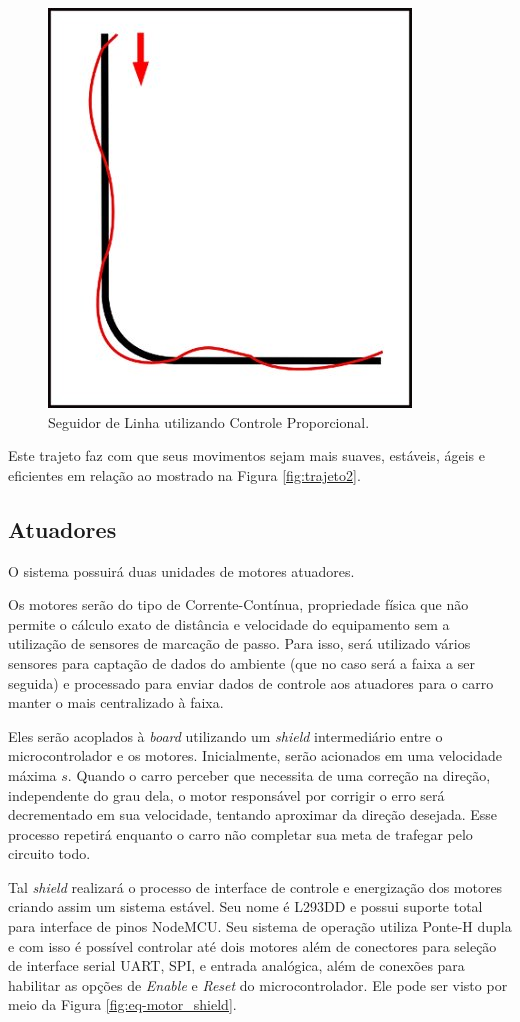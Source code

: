 \documentclass[portugues, brazil, a4paper,12pt]{article}
\begin{document}
		\begin{figure}[H]
			\centering
			\includegraphics[width=0.5\linewidth]{img/trajeto3.jpg}
			\caption{Seguidor de Linha utilizando Controle Proporcional.}
			\label{fig:trajeto3}
		\end{figure}
	
		Este trajeto faz com que seus movimentos sejam mais suaves, estáveis, ágeis e eficientes em relação ao mostrado na Figura \ref{fig:trajeto2}.
		
		
	\subsection{Atuadores}
		O sistema possuirá duas unidades de motores atuadores.
		
		Os motores serão do tipo de Corrente-Contínua, propriedade física que não permite o cálculo exato de distância e velocidade do equipamento sem a utilização de sensores de marcação de passo. Para isso, será utilizado vários sensores para captação de dados do ambiente (que no caso será a faixa a ser seguida) e processado para enviar dados de controle aos atuadores para o carro manter o mais centralizado à faixa.
		
		Eles serão acoplados à \textit{board} utilizando um \textit{shield} intermediário entre o microcontrolador e os motores. Inicialmente, serão acionados em uma velocidade máxima $ s $. Quando o carro perceber que necessita de uma correção na direção, independente do grau dela, o motor responsável por corrigir o erro será decrementado em sua velocidade, tentando aproximar da direção desejada. Esse processo repetirá enquanto o carro não completar sua meta de trafegar pelo circuito todo.
		
		Tal \textit{shield} realizará o processo de interface de controle e energização dos motores criando assim um sistema estável. Seu nome é L293DD e possui suporte total para interface de pinos NodeMCU. Seu sistema de operação utiliza Ponte-H dupla e com isso é possível controlar até dois motores além de conectores para seleção de interface serial UART, SPI, e entrada analógica, além de conexões para habilitar as opções de \textit{Enable} e \textit{Reset} do microcontrolador. Ele pode ser visto por meio da Figura \ref{fig:eq-motor_shield}.
		
\end{document}
